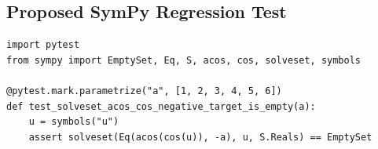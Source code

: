 \documentclass[11pt]{article}
\begin{document}
\subsection{Proposed SymPy Regression Test}

\medskip

\begin{lstlisting}[style=bugpython]
import pytest
from sympy import EmptySet, Eq, S, acos, cos, solveset, symbols

@pytest.mark.parametrize("a", [1, 2, 3, 4, 5, 6])
def test_solveset_acos_cos_negative_target_is_empty(a):
    u = symbols("u")
    assert solveset(Eq(acos(cos(u)), -a), u, S.Reals) == EmptySet
\end{lstlisting}
\end{document}
